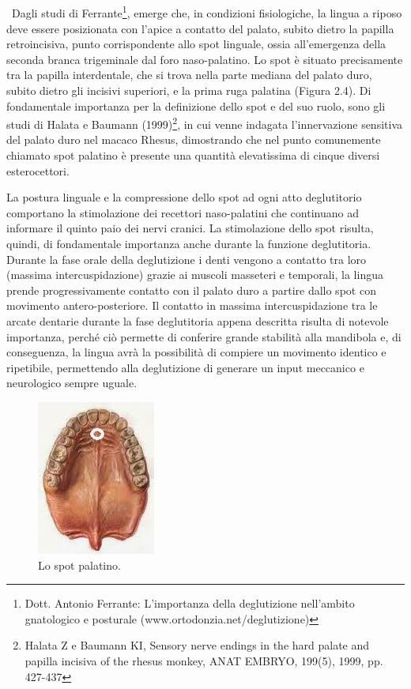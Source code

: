 \\\ \\\ \\\ \\\
Dagli studi di Ferrante\footnote{Dott. Antonio Ferrante: L'importanza della deglutizione nell'ambito gnatologico e posturale (www.ortodonzia.net/deglutizione)}, emerge che, in condizioni fisiologiche, la lingua a riposo deve essere posizionata con l'apice a contatto del palato, subito dietro la papilla retroincisiva, punto corrispondente allo spot linguale, ossia all'emergenza della seconda branca trigeminale dal foro naso-palatino.  Lo spot è situato precisamente tra la papilla interdentale, che si trova nella parte mediana del palato duro, subito dietro gli incisivi superiori, e la prima ruga palatina (Figura 2.4). Di fondamentale importanza per la definizione dello spot e del suo ruolo, sono gli studi di Halata e Baumann (1999)\footnote{Halata Z e Baumann KI, Sensory nerve endings in the hard palate and papilla incisiva of the rhesus monkey, ANAT
EMBRYO, 199(5), 1999, pp. 427-437}, in cui venne indagata l'innervazione sensitiva del palato duro nel macaco Rhesus, dimostrando che nel punto comunemente chiamato spot palatino è presente una quantità elevatissima di cinque diversi esterocettori. 

La postura linguale e la compressione dello spot ad ogni atto deglutitorio comportano la stimolazione dei recettori naso-palatini che continuano ad informare il quinto paio dei nervi cranici. La stimolazione dello spot risulta, quindi, di fondamentale importanza anche durante la funzione deglutitoria. Durante la fase orale della deglutizione i denti vengono a contatto tra loro (massima intercuspidazione) grazie ai muscoli masseteri e temporali, la lingua prende progressivamente contatto con il palato duro a partire dallo spot con movimento antero-posteriore. Il contatto in massima intercuspidazione tra le arcate dentarie durante la fase deglutitoria appena descritta risulta di notevole importanza, perché ciò permette di conferire grande stabilità alla mandibola e, di conseguenza, la lingua avrà la possibilità di compiere un movimento identico e ripetibile, permettendo alla deglutizione di generare un input meccanico e neurologico sempre uguale.

 \begin{figure}[h!]
	\centering
	\includegraphics[scale=0.4]{source/immagini/spot_palatino.jpg}
	\caption[Lo spot palatino]{Lo spot palatino.}
	\label{fig:issuexample}
\end{figure}

